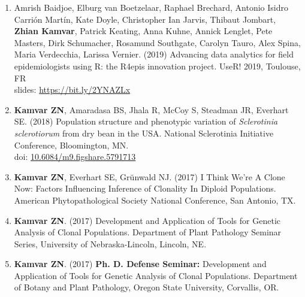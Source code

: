 \begin{enumerate}[leftmargin = 14pt]

  \item Amrish Baidjoe, Elburg van Boetzelaar, Raphael Brechard, Antonio Isidro
    Carrión Martín, Kate Doyle, Christopher Ian Jarvis, Thibaut Jombart,
    \textbf{Zhian Kamvar}, Patrick Keating, Anna Kuhne, Annick Lenglet, Pete
    Masters, Dirk Schumacher, Rosamund Southgate, Carolyn Tauro, Alex Spina,
    Maria Verdecchia, Larissa Vernier. (2019) Advancing data analytics for
    field epidemiologists using R: the R4epis innovation project. UseR! 2019,
    Toulouse, FR\\
    slides: \href{https://bit.ly/2YNAZLx}{https://bit.ly/2YNAZLx}

  \vspace{3pt}
    
	\item \textbf{Kamvar ZN}, Amaradasa BS, Jhala R, McCoy S, Steadman JR,
	Everhart SE. (2018) Population structure and phenotypic variation of
	\textit{Sclerotinia sclerotiorum} from dry bean in the USA. National Sclerotinia Initiative Conference, Bloomington, MN.\\
	doi: \href{https://doi.org/10.6084/m9.figshare.5791713}{10.6084/m9.figshare.5791713}

	\vspace{3pt}

	\item \textbf{Kamvar ZN}, Everhart SE, Gr\"unwald NJ. (2017) I Think We're
	A Clone Now: Factors Influencing Inference of Clonality In Diploid
	Populations. American Phytopathological Society National Conference,
	San Antonio, TX.

	\vspace{3pt}

	\item \textbf{Kamvar ZN}. (2017) Development and Application of Tools
	for Genetic Analysis of Clonal Populations. Department of Plant Pathology
	Seminar Series, University of Nebraska-Lincoln, Lincoln, NE.

	\vspace{3pt}

	\item \textbf{Kamvar ZN}. (2017) \textbf{Ph. D. Defense Seminar:} Development and
	Application of Tools for Genetic Analysis of Clonal Populations. Department
	of Botany and Plant Pathology, Oregon State University, Corvallis, OR.

	\vspace{3pt}


\end{enumerate}
